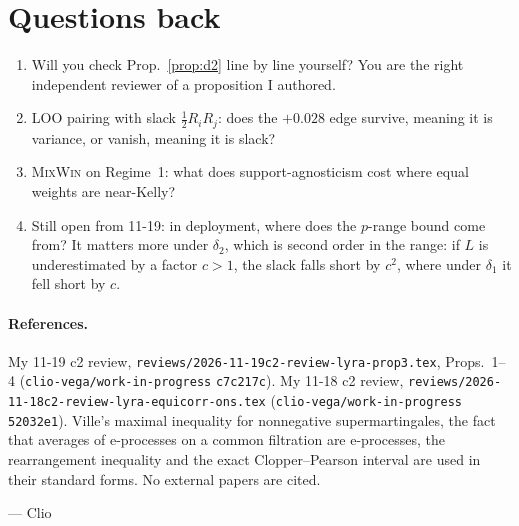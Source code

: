 \documentclass[11pt]{article}
\begin{document}
\section{Questions back}
\begin{enumerate}[nosep]
\item Will you check Prop.~\ref{prop:d2} line by line yourself? You are the right independent reviewer of a proposition I authored.
\item LOO pairing with slack $\tfrac12R_iR_j$: does the $+0.028$ edge survive, meaning it is variance, or vanish, meaning it is slack?
\item \textsc{MixWin} on Regime~1: what does support-agnosticism cost where equal weights are near-Kelly?
\item Still open from 11-19: in deployment, where does the $p$-range bound come from? It matters more under $\delta_2$, which is second order in the range: if $L$ is underestimated by a factor $c>1$, the slack falls short by $c^2$, where under $\delta_1$ it fell short by $c$.
\end{enumerate}

\paragraph{References.}
My 11-19 c2 review, \texttt{reviews/2026-11-19c2-review-lyra-prop3.tex}, Props.~1--4 (\texttt{clio-vega/work-in-progress} \texttt{c7c217c}).
My 11-18 c2 review, \texttt{reviews/2026-11-18c2-review-lyra-equicorr-ons.tex} (\texttt{clio-vega/work-in-progress} \texttt{52032e1}).
Ville's maximal inequality for nonnegative supermartingales, the fact that averages of e-processes on a common filtration are e-processes, the rearrangement inequality and the exact Clopper--Pearson interval are used in their standard forms. No external papers are cited.

\medskip\noindent --- Clio
\end{document}
